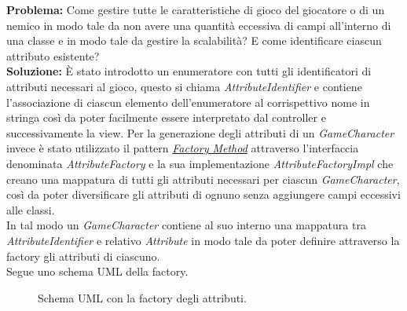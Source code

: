 \documentclass[a4paper,12pt]{report}
\begin{document}
\textbf{Problema:} Come gestire tutte le caratteristiche di gioco del giocatore o di un nemico in modo tale da non avere una quantità eccessiva di campi all'interno di una classe e in modo tale da gestire la scalabilità? E come identificare ciascun attributo esistente?\\
\textbf{Soluzione:} È stato introdotto un enumeratore con tutti gli identificatori di attributi necessari al gioco, questo si chiama \textit{AttributeIdentifier} e contiene l'associazione di ciascun elemento dell'enumeratore al corrispettivo nome in stringa così da poter facilmente essere interpretato dal controller e successivamente la view.
Per la generazione degli attributi di un \textit{GameCharacter} invece è stato utilizzato il pattern \href{https://refactoring.guru/design-patterns/factory-method}{\textit{Factory Method}} attraverso l'interfaccia denominata \textit{AttributeFactory} e la sua implementazione \textit{AttributeFactoryImpl} che creano una mappatura di tutti gli attributi necessari per ciascun \textit{GameCharacter}, così da poter diversificare gli attributi di ognuno senza aggiungere campi eccessivi alle classi.\\
In tal modo un \textit{GameCharacter} contiene al suo interno una mappatura tra \textit{AttributeIdentifier} e relativo \textit{Attribute} in modo tale da poter definire attraverso la factory gli attributi di ciascuno.\\ Segue uno schema UML della factory.\\

\begin{figure}[H]
	\centering
	
	\caption{Schema UML con la factory degli attributi.}
	\label{fig:Schema UML con la factory degli attributi.}
\end{figure}
\end{document}
